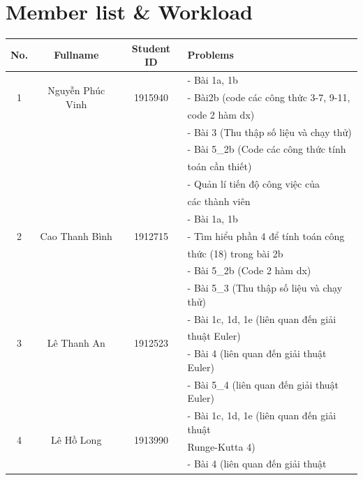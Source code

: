 \documentclass[a4paper]{article}
\begin{document}

\newpage
\tableofcontents
\newpage


\section{Member list \& Workload}


\begin{table}[ht]
\begin{tabular}{|c|c|c|l|}
\hline
\textbf{No.} & \textbf{Fullname} & \textbf{Student ID} & \textbf{Problems} \\
\hline 
\multirow{3}{*}{1} & \multirow{3}{*}{Nguyễn Phúc Vinh} & \multirow{3}{*}{1915940} & - Bài 1a, 1b \\
& &  & - Bài2b (code các công thức 3-7, 9-11, \\
& & & code 2 hàm dx)\\
& &  & - Bài 3 (Thu thập số liệu và chạy thử)\\
& &  & - Bài 5\_2b (Code các công thức tính \\
& &  & toán cần thiết)\\
& &  & - Quản lí tiến độ công việc của\\
& &  & các thành viên\\
\hline 
\multirow{3}{*}{2} & \multirow{3}{*}{Cao Thanh Bình} & \multirow{3}{*}{1912715} & - Bài 1a, 1b \\
& &  & - Tìm hiểu phần 4 để tính toán công \\
& &  & thức (18) trong bài 2b\\
& &  & - Bài 5\_2b (Code 2 hàm dx)\\
& &  & - Bài 5\_3 (Thu thập số liệu và chạy thử)\\
\hline
\multirow{3}{*}{3} & \multirow{3}{*}{Lê Thanh An} & \multirow{3}{*}{1912523} & - Bài 1c, 1d, 1e (liên quan đến giải \\
& &  & thuật Euler)\\
& &  & - Bài 4 (liên quan đến giải thuật Euler)\\
& &  & - Bài 5\_4 (liên quan đến giải thuật Euler)\\
\hline
\multirow{3}{*}{4} & \multirow{3}{*}{Lê Hồ Long} & \multirow{3}{*}{1913990} & - Bài 1c, 1d, 1e (liên quan đến giải thuật\\ 
& & &Runge-Kutta 4) \\
& &  & - Bài 4 (liên quan đến giải thuật \\

\end{tabular}
\end{table}
\end{document}
